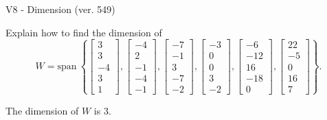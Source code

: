\begin{exercise}
  \begin{exerciseTitle}V8 - Dimension (ver. 549)\end{exerciseTitle}
  \begin{exerciseStatement}
    Explain how to find the dimension of 
\[W=\mathrm{span}\ \left\{\left[\begin{array}{r}
3 \\
3 \\
-4 \\
3 \\
1
\end{array}\right] , \left[\begin{array}{r}
-4 \\
2 \\
-1 \\
-4 \\
-1
\end{array}\right] , \left[\begin{array}{r}
-7 \\
-1 \\
3 \\
-7 \\
-2
\end{array}\right] , \left[\begin{array}{r}
-3 \\
0 \\
0 \\
3 \\
-2
\end{array}\right] , \left[\begin{array}{r}
-6 \\
-12 \\
16 \\
-18 \\
0
\end{array}\right] , \left[\begin{array}{r}
22 \\
-5 \\
0 \\
16 \\
7
\end{array}\right]\right\}.\]



  \end{exerciseStatement}
  \begin{exerciseAnswer}
   The dimension of \(W\) is  \(3\).
  


  \end{exerciseAnswer}
\end{exercise}
